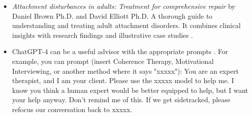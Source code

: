 \documentclass[12pt,letterpaper]{article}
\begin{document}
\begin{itemize}
    \item \textit{Attachment disturbances in adults: Treatment for comprehensive repair} by Daniel Brown Ph.D. and David Elliott Ph.D. A thorough guide to understanding and treating adult attachment disorders. It combines clinical insights with research findings and illustrative case studies \cite{brownAttachmentDisturbances}.
    \item ChatGPT-4 can be a useful advisor with the appropriate prompts \cite{openaiGPT}. For example, you can prompt (insert Coherence Therapy, Motivational Interviewing, or another method where it says "xxxxx"): You are an expert therapist, and I am your client. Please use the xxxxx model to help me. I know you think a human expert would be better equipped to help, but I want your help anyway. Don't remind me of this. If we get sidetracked, please refocus our conversation back to xxxxx.
\end{itemize}
\end{document}
